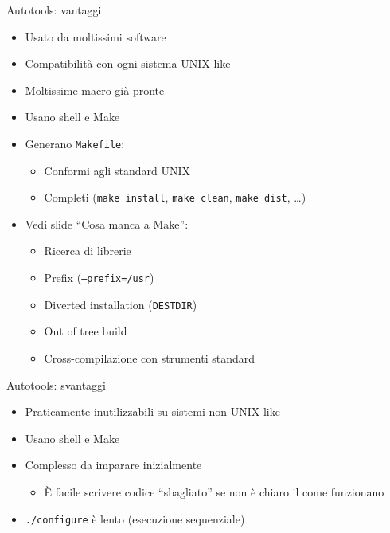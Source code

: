 \documentclass[xetex,table]{beamer}
\begin{document}
\begin{frame}{Autotools: vantaggi}
  \begin{itemize}

  \item Usato da moltissimi software
  \item Compatibilità con ogni sistema UNIX-like
  \item Moltissime macro già pronte
  \item Usano shell e Make
  \item Generano \texttt{Makefile}:
    \begin{itemize}
    \item Conformi agli standard UNIX
    \item Completi (\texttt{make install},
    \texttt{make clean},
    \texttt{make dist}, \dots)
    \end{itemize}

  \item Vedi slide ``Cosa manca a Make'':
    \begin{itemize}
    \item Ricerca di librerie
    \item Prefix (\texttt{--prefix=/usr})
    \item Diverted installation (\texttt{DESTDIR})
    \item Out of tree build
    \item Cross-compilazione con strumenti standard
    \end{itemize}

  \end{itemize}
\end{frame}

\begin{frame}{Autotools: svantaggi}
  \begin{itemize}
  \item Praticamente inutilizzabili su sistemi non UNIX-like
  \item Usano shell e Make
  \item Complesso da imparare inizialmente
    \begin{itemize}
    \item È facile scrivere codice ``sbagliato'' se non è chiaro il
      come funzionano
    \end{itemize}
  \item \texttt{./configure} è lento (esecuzione sequenziale)
  \end{itemize}
\end{frame}
\end{document}
